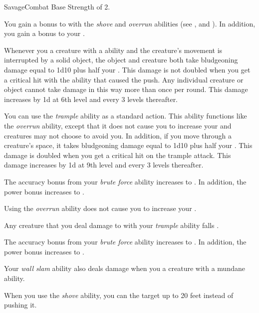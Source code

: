     \begin{feat}{Savage}{Combat}
        \featpre Base Strength of 2.

         You gain a  bonus to  with the \textit{shove} and \textit{overrun} abilities (see , and ).
        In addition, you gain a  bonus to your  .

         Whenever you  a creature with a  ability and the creature's movement is interrupted by a solid object, the object and creature both take bludgeoning damage equal to 1d10 plus half your .
        This damage is not doubled when you get a critical hit with the ability that caused the push.
        Any individual creature or object cannot take damage in this way more than once per round.
        This damage increases by \plus1d at 6th level and every 3 levels thereafter.

         You can use the \textit{trample} ability as a standard action.
        This ability functions like the \textit{overrun} ability, except that it does not cause you to increase your  and creatures may not choose to avoid you.
        In addition, if you move through a creature's space, it takes bludgeoning damage equal to 1d10 plus half your .
        This damage is doubled when you get a critical hit on the trample attack.
        This damage increases by \plus1d at 9th level and every 3 levels thereafter.

         The accuracy bonus from your \textit{brute force} ability increases to .
        In addition, the power bonus increases to .

         Using the \textit{overrun} ability does not cause you to increase your .

         Any creature that you deal damage to with your \textit{trample} ability falls .

         The accuracy bonus from your \textit{brute force} ability increases to .
        In addition, the power bonus increases to .

         Your \textit{wall slam} ability also deals damage when you  a creature with a mundane ability.

         When you use the \textit{shove} ability, you can  the target up to 20 feet instead of pushing it.
    \end{feat}


